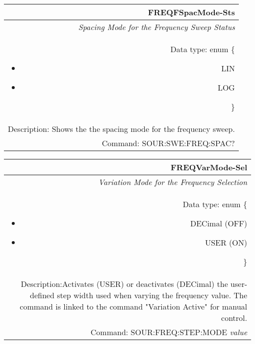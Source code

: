 \documentclass[openany]{article}
\begin{document}
		\begin{tabular}{N}
			\hline
			\bfseries FREQFSpacMode-Sts \\ \hline
			\emph{Spacing Mode for the Frequency Sweep Status} \\
			Data type: enum \{\begin{itemize}[noitemsep]
				\small
				\item[] LIN
				\item[] LOG
			\end{itemize}\} \\ 
			Description: Shows the the spacing mode for the frequency sweep. \\
			Command: SOUR:SWE:FREQ:SPAC? \\

		\end{tabular}
%
		\begin{tabular}{N}
			\hline
			\bfseries FREQVarMode-Sel \\ \hline
			\emph{Variation Mode for the Frequency Selection} \\
			Data type: enum \{\begin{itemize}[noitemsep]
				\small
				\item[] DECimal (OFF)
				\item[] USER (ON)
			\end{itemize}\} \\
			Description:Activates (USER) or deactivates (DECimal) the user-defined step width used when varying the frequency value. The command is linked to the command "Variation Active" for manual control. \\
			Command: SOUR:FREQ:STEP:MODE \emph{value} \\

		\end{tabular}
\end{document}
